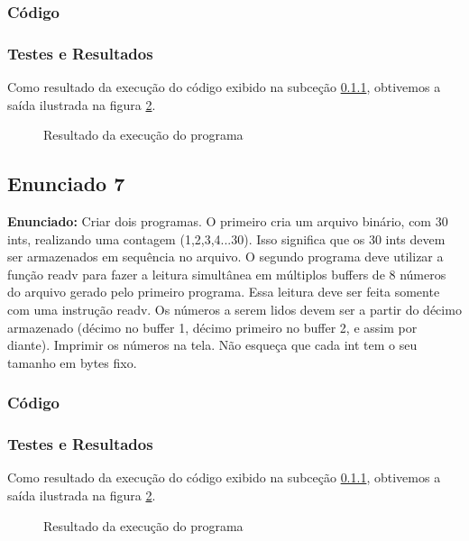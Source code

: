 \documentclass{article}
\begin{document}
\subsubsection{Código}
\label{sub-sec-cod}
%

\subsubsection{Testes e Resultados}
Como resultado da execução do código exibido na subceção \ref{sub-sec-cod}, obtivemos a saída ilustrada na figura \ref{fig:exec}. 

\begin{figure}[ht]
    \centering
    \caption{Resultado da execução do programa}
    \label{fig:exec}
\end{figure}

\subsection{Enunciado 7}

\textbf{Enunciado:}   Criar dois programas. O primeiro cria um arquivo binário, com 30 ints, realizando uma contagem (1,2,3,4...30). Isso significa que os 30 ints devem ser armazenados em sequência no arquivo. O segundo programa deve utilizar a função readv para fazer a leitura simultânea em múltiplos buffers de 8 números do arquivo gerado pelo primeiro programa. Essa leitura deve ser feita somente com uma instrução readv. Os números a serem lidos devem ser a partir do décimo armazenado (décimo no buffer 1, décimo primeiro no buffer 2, e assim por diante). Imprimir os números na tela. Não esqueça que cada int tem o seu tamanho em bytes fixo.\newline

\subsubsection{Código}
\label{sub-sec-cod}
%

\subsubsection{Testes e Resultados}
Como resultado da execução do código exibido na subceção \ref{sub-sec-cod}, obtivemos a saída ilustrada na figura \ref{fig:exec}. 

\begin{figure}[ht]
    \centering
    \caption{Resultado da execução do programa}
    \label{fig:exec}
\end{figure}

\printbibliography %
\end{document}
